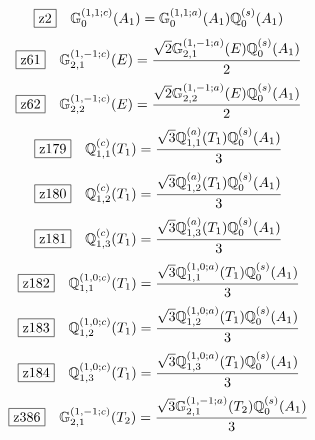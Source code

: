 \documentclass[fleqn,10pt,landscape]{jsarticle}
\begin{document}
\begin{dmath*}
\hspace*{3mm}\fbox{z2}\quad \mathbb{G}_{0}^{(1,1;c)}(A_{1})=\mathbb{G}_{0}^{(1,1;a)}(A_{1}) \mathbb{Q}_{0}^{(s)}(A_{1})
\end{dmath*}
\begin{dmath*}
\hspace*{3mm}\fbox{z61}\quad \mathbb{G}_{2,1}^{(1,-1;c)}(E)=\frac{\sqrt{2} \mathbb{G}_{2,1}^{(1,-1;a)}(E) \mathbb{Q}_{0}^{(s)}(A_{1})}{2}
\end{dmath*}
\begin{dmath*}
\hspace*{3mm}\fbox{z62}\quad \mathbb{G}_{2,2}^{(1,-1;c)}(E)=\frac{\sqrt{2} \mathbb{G}_{2,2}^{(1,-1;a)}(E) \mathbb{Q}_{0}^{(s)}(A_{1})}{2}
\end{dmath*}
\begin{dmath*}
\hspace*{3mm}\fbox{z179}\quad \mathbb{Q}_{1,1}^{(c)}(T_{1})=\frac{\sqrt{3} \mathbb{Q}_{1,1}^{(a)}(T_{1}) \mathbb{Q}_{0}^{(s)}(A_{1})}{3}
\end{dmath*}
\begin{dmath*}
\hspace*{3mm}\fbox{z180}\quad \mathbb{Q}_{1,2}^{(c)}(T_{1})=\frac{\sqrt{3} \mathbb{Q}_{1,2}^{(a)}(T_{1}) \mathbb{Q}_{0}^{(s)}(A_{1})}{3}
\end{dmath*}
\begin{dmath*}
\hspace*{3mm}\fbox{z181}\quad \mathbb{Q}_{1,3}^{(c)}(T_{1})=\frac{\sqrt{3} \mathbb{Q}_{1,3}^{(a)}(T_{1}) \mathbb{Q}_{0}^{(s)}(A_{1})}{3}
\end{dmath*}
\begin{dmath*}
\hspace*{3mm}\fbox{z182}\quad \mathbb{Q}_{1,1}^{(1,0;c)}(T_{1})=\frac{\sqrt{3} \mathbb{Q}_{1,1}^{(1,0;a)}(T_{1}) \mathbb{Q}_{0}^{(s)}(A_{1})}{3}
\end{dmath*}
\begin{dmath*}
\hspace*{3mm}\fbox{z183}\quad \mathbb{Q}_{1,2}^{(1,0;c)}(T_{1})=\frac{\sqrt{3} \mathbb{Q}_{1,2}^{(1,0;a)}(T_{1}) \mathbb{Q}_{0}^{(s)}(A_{1})}{3}
\end{dmath*}
\begin{dmath*}
\hspace*{3mm}\fbox{z184}\quad \mathbb{Q}_{1,3}^{(1,0;c)}(T_{1})=\frac{\sqrt{3} \mathbb{Q}_{1,3}^{(1,0;a)}(T_{1}) \mathbb{Q}_{0}^{(s)}(A_{1})}{3}
\end{dmath*}
\begin{dmath*}
\hspace*{3mm}\fbox{z386}\quad \mathbb{G}_{2,1}^{(1,-1;c)}(T_{2})=\frac{\sqrt{3} \mathbb{G}_{2,1}^{(1,-1;a)}(T_{2}) \mathbb{Q}_{0}^{(s)}(A_{1})}{3}
\end{dmath*}
\end{document}
